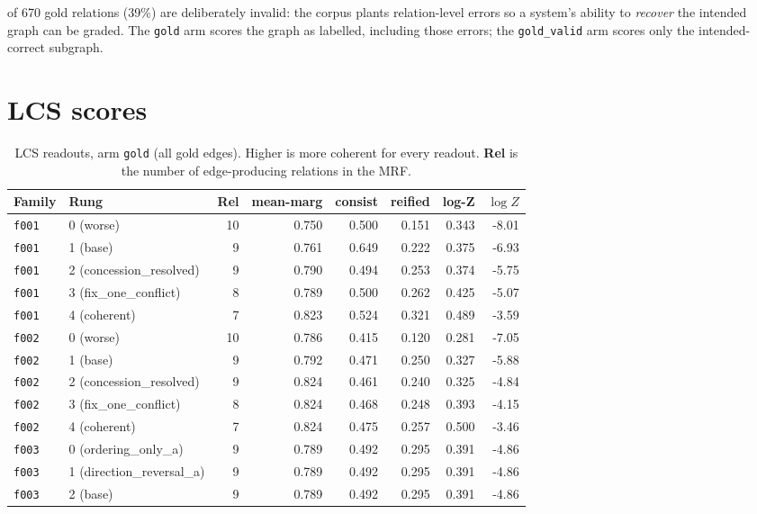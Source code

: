 \documentclass[11pt]{article}
\begin{document}
 of 670 gold relations (39\%) are deliberately invalid: the corpus plants relation-level errors so a system's ability to \emph{recover} the intended graph can be graded. The \texttt{gold} arm scores the graph as labelled, including those errors; the \texttt{gold\_valid} arm scores only the intended-correct subgraph.

\section{LCS scores}

\begin{table}[htbp]
\centering
\small
\caption{LCS readouts, arm \texttt{gold} (all gold edges). Higher is more coherent for every readout. \textbf{Rel} is the number of edge-producing relations in the MRF.}
\label{tab:scores-gold}
\begin{tabular}{llrrrrrr}
\toprule
Family & Rung & Rel & \textbf{mean-marg} & \textbf{consist} & \textbf{reified} & \textbf{log-Z} & $\log Z$ \\
\midrule
\texttt{f001} & 0 (worse) & 10 & 0.750 & 0.500 & 0.151 & 0.343 & -8.01 \\
\texttt{f001} & 1 (base) & 9 & 0.761 & 0.649 & 0.222 & 0.375 & -6.93 \\
\texttt{f001} & 2 (concession\_resolved) & 9 & 0.790 & 0.494 & 0.253 & 0.374 & -5.75 \\
\texttt{f001} & 3 (fix\_one\_conflict) & 8 & 0.789 & 0.500 & 0.262 & 0.425 & -5.07 \\
\texttt{f001} & 4 (coherent) & 7 & 0.823 & 0.524 & 0.321 & 0.489 & -3.59 \\
\midrule
\texttt{f002} & 0 (worse) & 10 & 0.786 & 0.415 & 0.120 & 0.281 & -7.05 \\
\texttt{f002} & 1 (base) & 9 & 0.792 & 0.471 & 0.250 & 0.327 & -5.88 \\
\texttt{f002} & 2 (concession\_resolved) & 9 & 0.824 & 0.461 & 0.240 & 0.325 & -4.84 \\
\texttt{f002} & 3 (fix\_one\_conflict) & 8 & 0.824 & 0.468 & 0.248 & 0.393 & -4.15 \\
\texttt{f002} & 4 (coherent) & 7 & 0.824 & 0.475 & 0.257 & 0.500 & -3.46 \\
\midrule
\texttt{f003} & 0 (ordering\_only\_a) & 9 & 0.789 & 0.492 & 0.295 & 0.391 & -4.86 \\
\texttt{f003} & 1 (direction\_reversal\_a) & 9 & 0.789 & 0.492 & 0.295 & 0.391 & -4.86 \\
\texttt{f003} & 2 (base) & 9 & 0.789 & 0.492 & 0.295 & 0.391 & -4.86 \\

\end{tabular}
\end{table}
\end{document}
